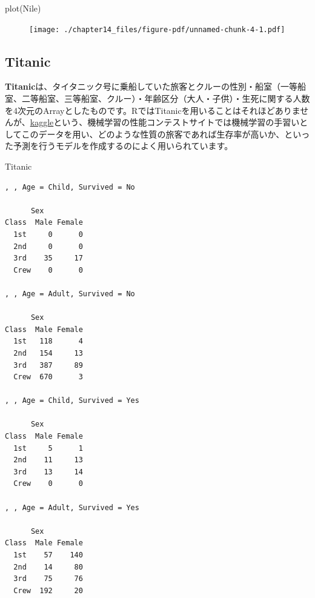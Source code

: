 \documentclass[
  letterpaper,
  DIV=11,
  numbers=noendperiod]{scrreprt}
\newenvironment{Shaded}{\begin{snugshade}}{\end{snugshade}}
\newcommand{\FunctionTok}[1]{\textcolor[rgb]{0.28,0.35,0.67}{#1}}
\newcommand{\NormalTok}[1]{\textcolor[rgb]{0.00,0.23,0.31}{#1}}
\begin{document}
\begin{Shaded}
\begin{Highlighting}[]
\FunctionTok{plot}\NormalTok{(Nile)}
\end{Highlighting}
\end{Shaded}

\begin{figure}[H]

{\centering \texttt{[image: ./chapter14\_files/figure-pdf/unnamed-chunk-4-1.pdf]}

}

\end{figure}

\hypertarget{titanic}{%
\subsection{Titanic}\label{titanic}}

\textbf{Titanic}は、タイタニック号に乗船していた旅客とクルーの性別・船室（一等船室、二等船室、三等船室、クルー）・年齢区分（大人・子供）・生死に関する人数を4次元のArrayとしたものです。RではTitanicを用いることはそれほどありませんが、\href{https://www.kaggle.com/}{kaggle}という、機械学習の性能コンテストサイトでは機械学習の手習いとしてこのデータを用い、どのような性質の旅客であれば生存率が高いか、といった予測を行うモデルを作成するのによく用いられています。

\begin{Shaded}
\begin{Highlighting}[]
\NormalTok{Titanic}
\end{Highlighting}
\end{Shaded}

\begin{verbatim}
, , Age = Child, Survived = No

      Sex
Class  Male Female
  1st     0      0
  2nd     0      0
  3rd    35     17
  Crew    0      0

, , Age = Adult, Survived = No

      Sex
Class  Male Female
  1st   118      4
  2nd   154     13
  3rd   387     89
  Crew  670      3

, , Age = Child, Survived = Yes

      Sex
Class  Male Female
  1st     5      1
  2nd    11     13
  3rd    13     14
  Crew    0      0

, , Age = Adult, Survived = Yes

      Sex
Class  Male Female
  1st    57    140
  2nd    14     80
  3rd    75     76
  Crew  192     20
\end{verbatim}
\end{document}
